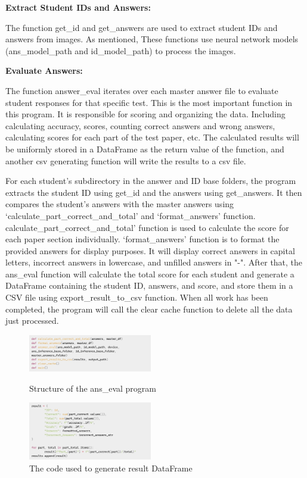 \documentclass[twocolumn]{article}
\begin{document}
        \textbf{Extract Student IDs and Answers:}

        The function get\_id and get\_answers are used to extract student IDs and answers from images. As mentioned, These functions use neural network models (ans\_model\_path and id\_model\_path) to process the images.

        \textbf{Evaluate Answers:}

        The function answer\_eval iterates over each master answer file to evaluate student responses for that specific test. This is the most important function in this program. It is responsible for scoring and organizing the data. Including calculating accuracy, scores, counting correct answers and wrong answers, calculating scores for each part of the test paper, etc. The calculated results will be uniformly stored in a DataFrame as the return value of the function, and another csv generating function will write the results to a csv file.

        For each student's subdirectory in the answer and ID base folders, the program extracts the student ID using get\_id and the answers using get\_answers. It then compares the student's answers with the master answers using `calculate\_part\_correct\_and\_total' and `format\_answers' function. calculate\_part\_correct\_and\_total' function is used to calculate the score for each paper section individually. `format\_answers' function is to format the provided answers for display purposes. It will display correct answers in capital letters, incorrect answers in lowercase, and unfilled answers in "-". After that, the ans\_eval function will calculate the total score for each student and generate a DataFrame containing the student ID, answers, and score, and store them in a CSV file using export\_result\_to\_csv function. When all work has been completed, the program will call the clear cache function to delete all the data just processed.

        \begin{figure}[ht]
            \centering
            \includegraphics*[width=0.48\textwidth]{ans_eval_structure.png}
            \caption{Structure of the ans\_eval program}
            \label{fig:ans_eval_structure}

            \includegraphics[width=0.48\textwidth]{result_dataframe.png}
            \caption{The code used to generate result DataFrame}
            \label{fig:result_dataframe}
        \end{figure}
\end{document}
